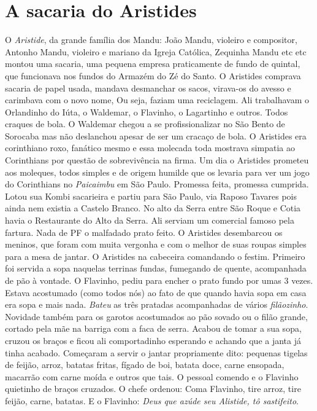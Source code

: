 \documentclass[12pt,brazil,]{book}
\begin{document}
\section{A sacaria do Aristides}\label{a-sacaria-do-aristides}

O \emph{Aristide}, da grande família dos Mandu: João Mandu, violeiro e
compositor, Antonho Mandu, violeiro e mariano da Igreja Católica,
Zequinha Mandu etc etc montou uma sacaria, uma pequena empresa
praticamente de fundo de quintal, que funcionava nos fundos do Armazém
do Zé do Santo. O Aristides comprava sacaria de papel usada, mandava
desmanchar os sacos, virava-os do avesso e carimbava com o novo nome, Ou
seja, faziam uma reciclagem. Ali trabalhavam o Orlandinho do Iúta, o
Waldemar, o Flavinho, o Lagartinho e outros. Todos craques de bola. O
Waldemar chegou a se profissionalizar no São Bento de Sorocaba mas não
deslanchou apesar de ser um cracaço de bola. O Aristides era corinthiano
roxo, fanático mesmo e essa molecada toda mostrava simpatia ao
Corinthians por questão de sobrevivência na firma. Um dia o Aristides
prometeu aos moleques, todos simples e de origem humilde que os levaria
para ver um jogo do Corinthians no \emph{Paicaimbu} em São Paulo.
Promessa feita, promessa cumprida. Lotou sua Kombi sacarieira e partiu
para São Paulo, via Raposo Tavares pois ainda nem existia a Castelo
Branco. No alto da Serra entre São Roque e Cotia havia o Restaurante do
Alto da Serra. Ali serviam um comercial famoso pela fartura. Nada de PF
o malfadado prato feito. O Aristides desembarcou os meninos, que foram
com muita vergonha e com o melhor de suas roupas simples para a mesa de
jantar. O Aristides na cabeceira comandando o festim. Primeiro foi
servida a sopa naquelas terrinas fundas, fumegando de quente,
acompanhada de pão à vontade. O Flavinho, pediu para encher o prato
fundo por umas 3 vezes. Estava acostumado (como todos nós) ao fato de
que quando havia sopa em casa era sopa e mais nada. \emph{Bateu} as três
pratadas acompanhadas de vários \emph{filãozinho}. Novidade também para
os garotos acostumados ao pão sovado ou o filão grande, cortado pela mãe
na barriga com a faca de serra. Acabou de tomar a sua sopa, cruzou os
braços e ficou ali comportadinho esperando e achando que a janta já
tinha acabado. Começaram a servir o jantar propriamente dito: pequenas
tigelas de feijão, arroz, batatas fritas, fígado de boi, batata doce,
carne ensopada, macarrão com carne moída e outros que tais. O pessoal
comendo e o Flavinho quietinho de braços cruzados. O chefe ordenou: Coma
Flavinho, tire arroz, tire feijão, carne, batatas. E o Flavinho:
\emph{Deus que azúde seu Alistide, tô sastifeito}.
\end{document}
